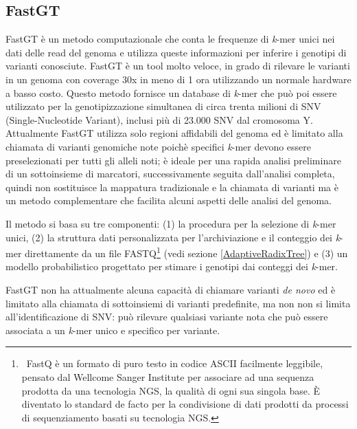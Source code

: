 \documentclass[../main.tex]{subfiles}
\begin{document}
\subsection{FastGT}
\label{fastgt}

FastGT \cite{pajuste2017fastgt} è un metodo computazionale che conta le frequenze di \textit{k}-mer unici nei dati delle read del genoma e utilizza queste informazioni per inferire i genotipi di varianti conosciute. FastGT è un tool molto veloce, in grado di rilevare le varianti in un genoma con coverage 30x in meno di 1 ora utilizzando un normale hardware a basso costo. Questo metodo fornisce un database di \textit{k}-mer che può poi essere utilizzato per la genotipizzazione simultanea di circa trenta milioni di SNV (Single-Nucleotide Variant), inclusi più di 23.000 SNV dal cromosoma Y. Attualmente FastGT utilizza solo regioni affidabili del genoma ed è limitato alla chiamata di varianti genomiche note poichè specifici \textit{k}-mer devono essere preselezionati per tutti gli alleli noti; è ideale per una rapida analisi preliminare di un sottoinsieme di marcatori, successivamente seguita dall'analisi completa, quindi non sostituisce la mappatura tradizionale e la chiamata di varianti ma è un metodo complementare che facilita alcuni aspetti delle analisi del genoma.

Il metodo si basa su tre componenti: (1) la procedura per la selezione di \textit{k}-mer unici, (2) la struttura dati personalizzata per l'archiviazione e il conteggio dei \textit{k}-mer direttamente da un file FASTQ\footnote{\ FastQ è un formato di puro testo in codice ASCII facilmente leggibile, pensato dal Wellcome Sanger Institute per associare ad una sequenza prodotta da una tecnologia NGS, la qualità di ogni sua singola base. È diventato lo standard de facto per la condivisione di dati \cite{cock2010sanger} \label{nota:FASTQ} prodotti da processi di sequenziamento basati su tecnologia NGS.} (vedi sezione \ref{AdaptiveRadixTree}) e (3) un modello probabilistico progettato per stimare i genotipi dai conteggi dei \textit{k}-mer.

FastGT non ha attualmente alcuna capacità di chiamare varianti \textit{de novo} ed è limitato alla chiamata di sottoinsiemi di varianti predefinite, ma non non si limita all'identificazione di SNV: può rilevare qualsiasi variante nota che può essere associata a un \textit{k}-mer unico e specifico per variante. %
\end{document}
